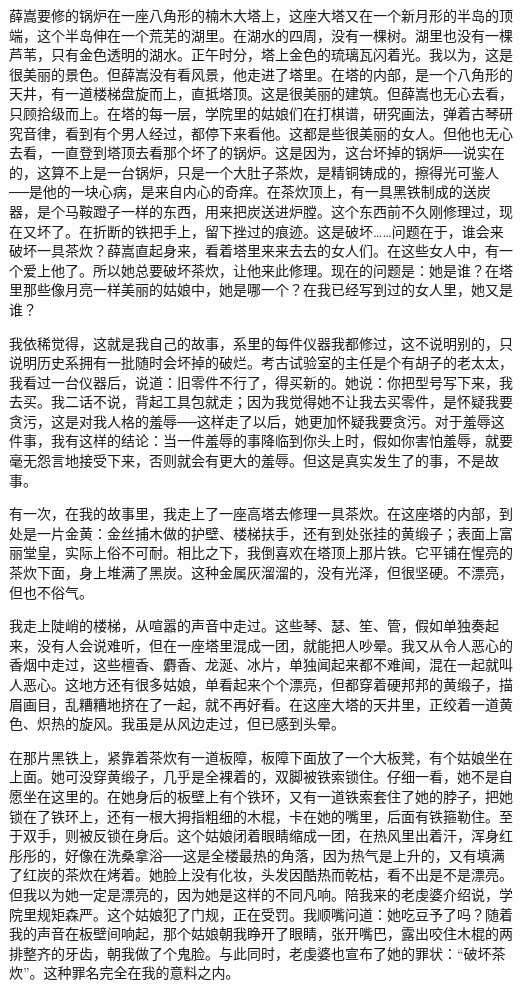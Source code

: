 薛嵩要修的锅炉在一座八角形的楠木大塔上，这座大塔又在一个新月形的半岛的顶端，这个半岛伸在一个荒芜的湖里。在湖水的四周，没有一棵树。湖里也没有一棵芦苇，只有金色透明的湖水。正午时分，塔上金色的琉璃瓦闪着光。我以为，这是很美丽的景色。但薛嵩没有看风景，他走进了塔里。在塔的内部，是一个八角形的天井，有一道楼梯盘旋而上，直抵塔顶。这是很美丽的建筑。但薛嵩也无心去看，只顾拾级而上。在塔的每一层，学院里的姑娘们在打棋谱，研究画法，弹着古琴研究音律，看到有个男人经过，都停下来看他。这都是些很美丽的女人。但他也无心去看，一直登到塔顶去看那个坏了的锅炉。这是因为，这台坏掉的锅炉──说实在的，这算不上是一台锅炉，只是一个大肚子茶炊，是精铜铸成的，擦得光可鉴人──是他的一块心病，是来自内心的奇痒。在茶炊顶上，有一具黑铁制成的送炭器，是个马鞍蹬子一样的东西，用来把炭送进炉膛。这个东西前不久刚修理过，现在又坏了。在折断的铁把手上，留下挫过的痕迹。这是破坏……问题在于，谁会来破坏一具茶炊？薛嵩直起身来，看着塔里来来去去的女人们。在这些女人中，有一个爱上他了。所以她总要破坏茶炊，让他来此修理。现在的问题是：她是谁？在塔里那些像月亮一样美丽的姑娘中，她是哪一个？在我已经写到过的女人里，她又是谁？ 

我依稀觉得，这就是我自己的故事，系里的每件仪器我都修过，这不说明别的，只说明历史系拥有一批随时会坏掉的破烂。考古试验室的主任是个有胡子的老太太，我看过一台仪器后，说道：旧零件不行了，得买新的。她说：你把型号写下来，我去买。我二话不说，背起工具包就走；因为我觉得她不让我去买零件，是怀疑我要贪污，这是对我人格的羞辱──这样走了以后，她更加怀疑我要贪污。对于羞辱这件事，我有这样的结论：当一件羞辱的事降临到你头上时，假如你害怕羞辱，就要毫无怨言地接受下来，否则就会有更大的羞辱。但这是真实发生了的事，不是故事。 

有一次，在我的故事里，我走上了一座高塔去修理一具茶炊。在这座塔的内部，到处是一片金黄：金丝捕木做的护壁、楼梯扶手，还有到处张挂的黄缎子；表面上富丽堂皇，实际上俗不可耐。相比之下，我倒喜欢在塔顶上那片铁。它平铺在惺亮的茶炊下面，身上堆满了黑炭。这种金属灰溜溜的，没有光泽，但很坚硬。不漂亮，但也不俗气。 

我走上陡峭的楼梯，从喧嚣的声音中走过。这些琴、瑟、笙、管，假如单独奏起来，没有人会说难听，但在一座塔里混成一团，就能把人吵晕。我又从令人恶心的香烟中走过，这些檀香、麝香、龙涎、冰片，单独闻起来都不难闻，混在一起就叫人恶心。这地方还有很多姑娘，单看起来个个漂亮，但都穿着硬邦邦的黄缎子，描眉画目，乱糟糟地挤在了一起，就不再好看。在这座大塔的天井里，正绞着一道黄色、炽热的旋风。我虽是从风边走过，但已感到头晕。 

在那片黑铁上，紧靠着茶炊有一道板障，板障下面放了一个大板凳，有个姑娘坐在上面。她可没穿黄缎子，几乎是全裸着的，双脚被铁索锁住。仔细一看，她不是自愿坐在这里的。在她身后的板壁上有个铁环，又有一道铁索套住了她的脖子，把她锁在了铁环上，还有一根大拇指粗细的木棍，卡在她的嘴里，后面有铁箍勒住。至于双手，则被反锁在身后。这个姑娘闭着眼睛缩成一团，在热风里出着汗，浑身红彤彤的，好像在洗桑拿浴──这是全楼最热的角落，因为热气是上升的，又有填满了红炭的茶炊在烤着。她脸上没有化妆，头发因酷热而乾枯，看不出是不是漂亮。但我以为她一定是漂亮的，因为她是这样的不同凡响。陪我来的老虔婆介绍说，学院里规矩森严。这个姑娘犯了门规，正在受罚。我顺嘴问道：她吃豆予了吗？随着我的声音在板壁间响起，那个姑娘朝我睁开了眼睛，张开嘴巴，露出咬住木棍的两排整齐的牙齿，朝我做了个鬼脸。与此同时，老虔婆也宣布了她的罪状：“破坏茶炊”。这种罪名完全在我的意料之内。 

